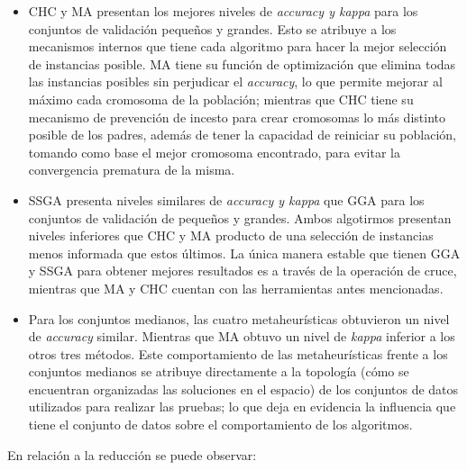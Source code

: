 \begin{itemize}

\item CHC y MA presentan los mejores niveles de \emph{accuracy y kappa} para los conjuntos de validación pequeños y grandes. Esto se atribuye a los mecanismos internos que tiene cada algoritmo para hacer la mejor selección de instancias posible. MA tiene su función de optimización que elimina todas las instancias posibles sin perjudicar el \emph{accuracy}, lo que permite mejorar al máximo cada cromosoma de la población; mientras que CHC tiene su mecanismo de prevención de incesto para crear cromosomas lo más distinto posible de los padres, además de tener la capacidad de reiniciar su población, tomando como base el mejor cromosoma encontrado, para evitar la convergencia prematura de la misma.

\item SSGA presenta niveles similares de \emph{accuracy y kappa} que GGA para los conjuntos de validación de pequeños y grandes. Ambos algotirmos presentan niveles inferiores que CHC y MA producto de una selección de instancias menos informada que estos últimos. La única manera estable que tienen GGA y SSGA para obtener mejores resultados es a través de la operación de cruce, mientras que MA y CHC cuentan con las herramientas antes mencionadas.

\item Para los conjuntos medianos, las cuatro metaheurísticas obtuvieron un nivel de \emph{accuracy} similar. Mientras que MA obtuvo un nivel de \emph{kappa} inferior a los otros tres métodos. Este comportamiento de las metaheurísticas frente a los conjuntos medianos se atribuye directamente a la topología (cómo se encuentran organizadas las soluciones en el espacio) de los conjuntos de datos utilizados para realizar las pruebas; lo que deja en evidencia la influencia que tiene el conjunto de datos sobre el comportamiento de los algoritmos.

\end{itemize}

En relación a la reducción se puede observar:


